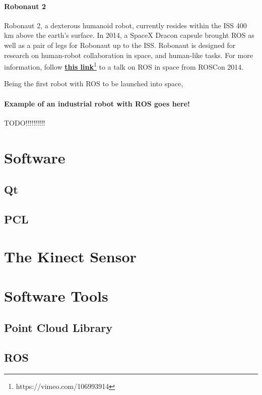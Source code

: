 \paragraph{Robonaut 2}

Robonaut 2, a dexterous humanoid robot, currently resides within the \ac{ISS} 400 km above the earth's surface. In 2014, a SpaceX Dracon capsule brought \ac{ROS} as well as a pair of legs for Robonaut up to the \ac{ISS}\cite{http://www.ros.org/news/2014/09/ros-running-on-iss.html}. Robonaut is designed for research on human-robot collaboration in space, and human-like tasks. For more information, follow \href{https://vimeo.com/106993914}{\textbf{this link}}\footnote{https://vimeo.com/106993914} to a talk on \ac{ROS} in space from ROSCon 2014.

Being the first robot with \ac{ROS} to be launched into space, 

\paragraph{Example of an industrial robot with ROS goes here!}

TODO!!!!!!!!!!

\section{Software}

\subsection{Qt}

\subsection{PCL}

\section{The Kinect Sensor}

\section{Software Tools}

\subsection{Point Cloud Library}

\subsection{ROS}

